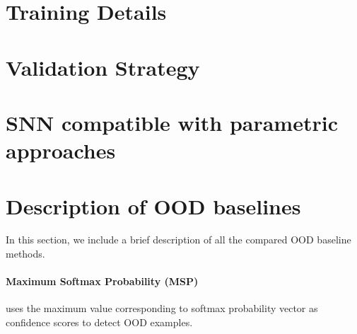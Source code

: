 \section{Training Details}
\label{app:train}



\section{Validation Strategy}
\label{app:validation}


\section{SNN compatible with parametric approaches}

\begin{table}[h]
\centering
{}
\caption{\name is also compatible with parametric approaches such as Mahalanobis distance~\cite{lee2018simple}. All values are averaged over multiple OOD test datasets.}
\label{tab:compatibility}
\end{table}


\section{Description of OOD baselines}
\label{app:ood_description}
In this section, we include a brief description of all the compared OOD baseline methods.

\paragraph{Maximum Softmax Probability (MSP) \cite{hendrycks2016baseline}} uses the maximum value corresponding to softmax probability vector as confidence scores to detect OOD examples.

